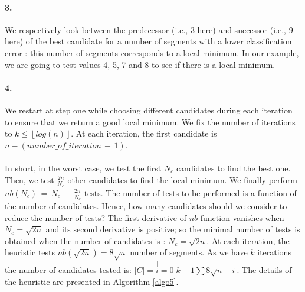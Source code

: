 \paragraph{3.} We respectively look between the predecessor (i.e., 3 here) and successor (i.e., 9
here) of the best candidate for a number of segments with a lower classification error : this number
of segments corresponds to a local minimum.
In our example, we are going to test values 4, 5, 7 and 8 to see if there is a local minimum.


\begin{center}


\end{center}



\paragraph{4.} We restart at step one while choosing
different candidates during each iteration to ensure that we return a good
local minimum. We fix the number of iterations to $k \leq \left\lfloor log(n)\right\rfloor $. At each iteration, the first candidate is $n-(number \_ of \_ iteration \,-\, 1)$.


\paragraph{}In short, in the worst case, we test the first $N_{c}$ candidates to find the best one.
Then, we test $\frac{2n}{N_{c}}$ other candidates to find the local minimum.
We finally perform $nb(N_{c})\, =\, N_{c}\, +\, \frac{2n}{N_{c}}$ tests. The number of tests
 to be performed is a function of the number of candidates. Hence, how many
candidates should we consider to reduce the number of tests? The first
derivative of $nb$ function  vanishes when $N_{c}=\sqrt{2n}$ and its second derivative is
positive; so the minimal number of tests is obtained when the number of candidates is : 
$N_{c}=\sqrt{2n}$. At each
iteration, the heuristic tests $nb(\sqrt{2n})=8\sqrt{n}$ number of segments. As we have $k$
iterations the number of candidates tested is: $|C|=\stackrel[i=0]{k-1}{\sum}{\textstyle
8\sqrt{n-i}}$. The details of the heuristic are presented in Algorithm \ref{algo5}.

